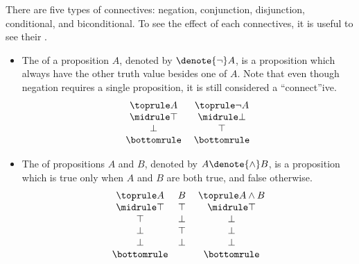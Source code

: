 There are five types of connectives:
negation,
conjunction,
disjunction,
conditional,
and biconditional.
To see the effect of each connectives,
it is useful to see their .
\begin{itemize}
    \item The  of a proposition \(A\),
    denoted by \(\denote{\neg} A\),
    is a proposition which always have the other truth value
    besides one of \(A\).
    Note that even though negation requires a single proposition,
    it is still considered a ``connect''ive.
    \[
        \begin{array}{c}\toprule
            A \\ \midrule
            \top \\
            \bot \\ \bottomrule
        \end{array}
        \;
        \begin{array}{c}\toprule
            \neg A \\ \midrule
            \bot \\
            \top \\ \bottomrule
        \end{array}
    \]

    \item The  of propositions \(A\) and \(B\),
    denoted by \(A\denote{\wedge} B\),
    is a proposition which is true
    only when \(A\) and \(B\) are both true,
    and false otherwise.
    \[
        \begin{array}{c c}\toprule
            A & B \\ \midrule
            \top & \top \\
            \top & \bot \\
            \bot & \top \\
            \bot & \bot \\ \bottomrule
        \end{array}
        \;
        \begin{array}{c}\toprule
            A\wedge B \\ \midrule
            \top \\
            \bot \\
            \bot \\
            \bot \\ \bottomrule
        \end{array}
    \]


\end{itemize}

